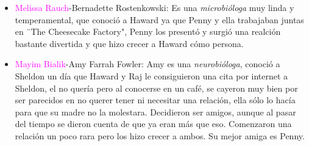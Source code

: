 \documentclass[a5paper, 11pt]{article}
\begin{document}
\begin{itemize}
    \item \textcolor{magenta}{ {Melissa Rauch}}-Bernadette Rostenkowski: Es una \emph{microbióloga} muy linda y temperamental, que conoció a Haward ya que Penny y ella trabajaban juntas en ¨The Cheesecake Factory", Penny los presentó y surgió una realción bastante divertida y que hizo crecer a Haward cómo persona.
    
    \item \textcolor{magenta}{ {Mayim Bialik}}-Amy Farrah Fowler: Amy es una \emph{neurobióloga}, conoció a Sheldon un día que Haward y Raj le consiguieron una cita por internet a Sheldon, el no quería pero al conocerse en un café, se cayeron muy bien por ser parecidos en no querer tener ni necesitar una relación, ella sólo lo hacía para que su madre no la molestara. Decidieron ser amigos, aunque al pasar del tiempo se dieron cuenta de que ya eran más que eso. Comenzaron una relación un poco rara pero los hizo crecer a ambos. Su mejor amiga es Penny. 
    
\end{itemize}
\end{document}
